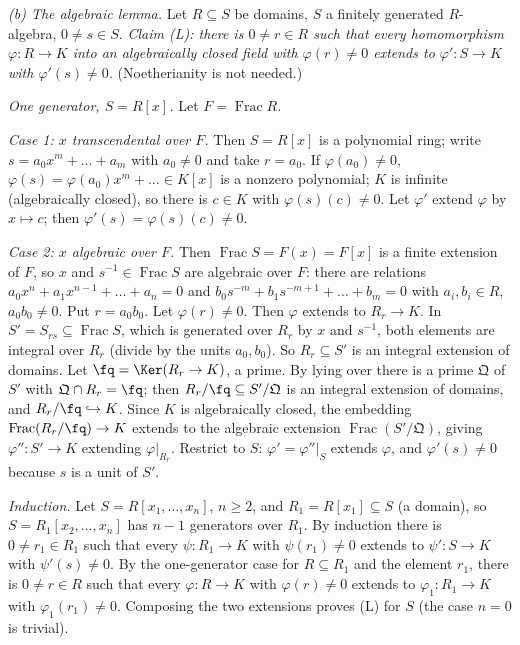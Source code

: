 \documentclass[11pt]{article}
\begin{document}
\emph{(b) The algebraic lemma.} Let $R\subseteq S$ be domains, $S$ a finitely generated $R$-algebra, $0\ne s\in S$. \emph{Claim (L): there is $0\ne r\in R$ such that every homomorphism $\varphi:R\to K$ into an algebraically closed field with $\varphi(r)\ne0$ extends to $\varphi':S\to K$ with $\varphi'(s)\ne0$.} (Noetherianity is not needed.)

\emph{One generator, $S=R[x]$.} Let $F=\operatorname{Frac}R$.

\emph{Case 1: $x$ transcendental over $F$.} Then $S=R[x]$ is a polynomial ring; write $s=a_0x^m+\dots+a_m$ with $a_0\ne0$ and take $r=a_0$. If $\varphi(a_0)\ne0$, $\varphi(s)=\varphi(a_0)x^m+\dots\in K[x]$ is a nonzero polynomial; $K$ is infinite (algebraically closed), so there is $c\in K$ with $\varphi(s)(c)\ne0$. Let $\varphi'$ extend $\varphi$ by $x\mapsto c$; then $\varphi'(s)=\varphi(s)(c)\ne0$.

\emph{Case 2: $x$ algebraic over $F$.} Then $\operatorname{Frac}S=F(x)=F[x]$ is a finite extension of $F$, so $x$ and $s^{-1}\in\operatorname{Frac}S$ are algebraic over $F$: there are relations $a_0x^n+a_1x^{n-1}+\dots+a_n=0$ and $b_0s^{-m}+b_1s^{-m+1}+\dots+b_m=0$ with $a_i,b_i\in R$, $a_0b_0\ne0$. Put $r=a_0b_0$. Let $\varphi(r)\ne0$. Then $\varphi$ extends to $R_r\to K$. In $S'=S_{rs}\subseteq\operatorname{Frac}S$, which is generated over $R_r$ by $x$ and $s^{-1}$, both elements are integral over $R_r$ (divide by the units $a_0,b_0$). So $R_r\subseteq S'$ is an integral extension of domains. Let $\fq=\Ker(R_r\to K)$, a prime. By lying over there is a prime $\mathfrak Q$ of $S'$ with $\mathfrak Q\cap R_r=\fq$; then $R_r/\fq\subseteq S'/\mathfrak Q$ is an integral extension of domains, and $R_r/\fq\hookrightarrow K$. Since $K$ is algebraically closed, the embedding $\operatorname{Frac}(R_r/\fq)\to K$ extends to the algebraic extension $\operatorname{Frac}(S'/\mathfrak Q)$, giving $\varphi'':S'\to K$ extending $\varphi|_{R_r}$. Restrict to $S$: $\varphi'=\varphi''|_S$ extends $\varphi$, and $\varphi'(s)\ne0$ because $s$ is a unit of $S'$.

\emph{Induction.} Let $S=R[x_1,\dots,x_n]$, $n\ge2$, and $R_1=R[x_1]\subseteq S$ (a domain), so $S=R_1[x_2,\dots,x_n]$ has $n-1$ generators over $R_1$. By induction there is $0\ne r_1\in R_1$ such that every $\psi:R_1\to K$ with $\psi(r_1)\ne0$ extends to $\psi':S\to K$ with $\psi'(s)\ne0$. By the one-generator case for $R\subseteq R_1$ and the element $r_1$, there is $0\ne r\in R$ such that every $\varphi:R\to K$ with $\varphi(r)\ne0$ extends to $\varphi_1:R_1\to K$ with $\varphi_1(r_1)\ne0$. Composing the two extensions proves (L) for $S$ (the case $n=0$ is trivial).
\end{document}
